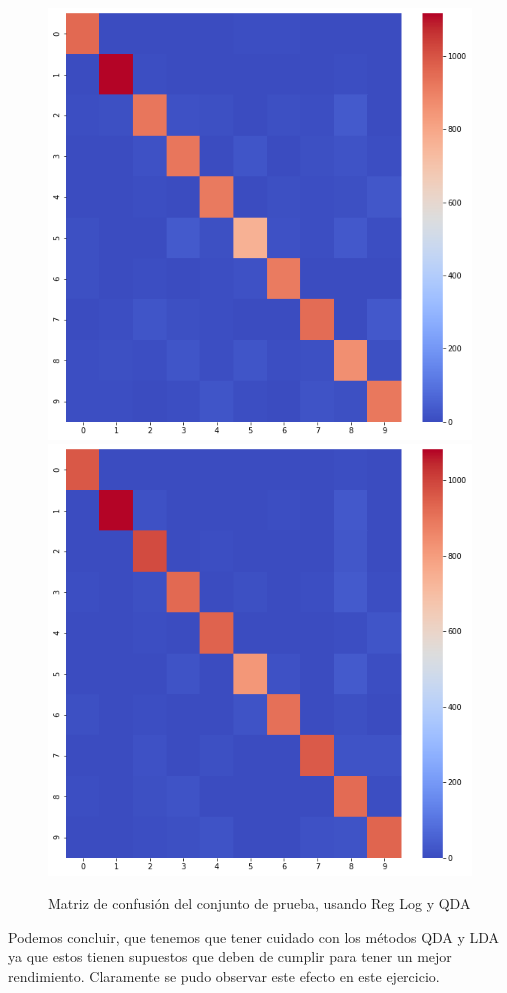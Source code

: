 \documentclass[paper=letter, fontsize=11pt]{scrartcl}
\numberwithin{equation}{section} %
\numberwithin{figure}{section} %
\numberwithin{table}{section} %
\begin{document}
\begin{figure}[!htb]
  \includegraphics[width=\linewidth]{figure/log_reg_confusion.png}
\endminipage\hfill
{}
  \includegraphics[width=\linewidth]{figure/qda_confusion_best.png}
\endminipage
\caption{Matriz de confusión del conjunto de prueba, usando Reg Log y QDA}
\label{fig:comparacion_bbst}
\end{figure}
Podemos concluir, que tenemos que tener cuidado con los métodos QDA y LDA ya que estos tienen supuestos que deben de cumplir para tener un mejor rendimiento. Claramente se pudo observar este efecto en este ejercicio.
\end{document}

